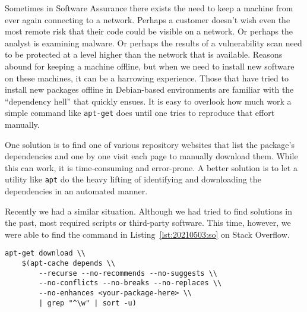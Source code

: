 Sometimes in Software Assurance there exists the need to keep a machine from ever again connecting to a network. Perhaps a customer doesn't wish even the most remote risk that their code could be visible on a network. Or perhaps the analyst is examining malware. Or perhaps the results of a vulnerability scan need to be protected at a level higher than the network that is available. Reasons abound for keeping a machine offline, but when we need to install new software on these machines, it can be a harrowing experience. Those that have tried to install new packages offline in Debian-based environments are familiar with the ``dependency hell'' that quickly ensues. It is easy to overlook how much work a simple command like \texttt{apt-get} does until one tries to reproduce that effort manually.

One solution is to find one of various repository websites that list the package's dependencies and one by one visit each page to manually download them. While this can work, it is time-consuming and error-prone. A better solution is to let a utility like \texttt{apt} do the heavy lifting of identifying and downloading the dependencies in an automated manner.

Recently we had a similar situation. Although we had tried to find solutions in the past, most required scripts or third-party software. This time, however, we were able to find the command in Listing~\ref{lst:20210503:so} on Stack Overflow.\autocite{20210503-stackoverflow}

\begin{lstlisting}[caption={Deep Dependency Downloading},captionpos=b,style=BashStyle,basicstyle=\small,label={lst:20210503:so},literate=*{-}{-}1]
apt-get download \\
	$(apt-cache depends \\
		--recurse --no-recommends --no-suggests \\
		--no-conflicts --no-breaks --no-replaces \\
		--no-enhances <your-package-here> \\
		| grep "^\w" | sort -u)
\end{lstlisting}

